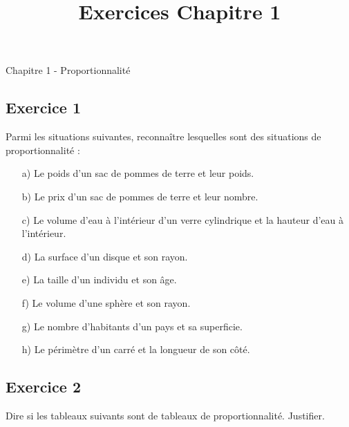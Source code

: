 \documentclass[12 pt]{extarticle}
\title{Exercices Chapitre 1}
\date{}
\theoremstyle{plain}
\begin{document}
\begin{center}{\Large Chapitre 1 - Proportionnalité}\\
 \end{center} 

\subsection*{Exercice 1}

Parmi les situations suivantes, reconnaître lesquelles sont des situations de proportionnalité : \begin{itemize}
\item[a)] Le poids d'un sac de pommes de terre et leur poids.
\item[b)] Le prix d'un sac de pommes de terre et leur nombre.
\item[c)] Le volume d'eau à l'intérieur d'un verre cylindrique 
et la hauteur d'eau à l'intérieur. 
\item[d)] La surface d'un disque et son rayon.
\item[e)] La taille d'un individu et son âge.
\item[f)] Le volume d'une sphère et son rayon.
\item[g)] Le nombre d'habitants d'un pays et sa superficie. 
\item[h)] Le périmètre d'un carré et la longueur de son côté. 
\end{itemize}


\subsection*{Exercice 2}
{Dire si les tableaux suivants sont de tableaux de proportionnalité. Justifier.}
\end{document}

